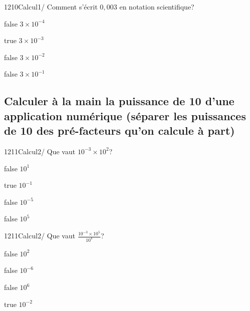 \documentclass[11pt]{article}
\begin{document}
        	\begin{question}{1210}{Calcul}{1}{/}
				Comment s'écrit $0,003$ en notation scientifique? 
            \end{question}

            \begin{reponses}
            	\item[false] $3\times 10^{-4}$
            	\item[true] $3\times 10^{-3}$
                \item[false] $3\times 10^{-2}$
                \item[false] $3\times 10^{-1}$
            \end{reponses}

        \subsection{Calculer à la main la puissance de 10 d'une application numérique (séparer les puissances de 10 des pré-facteurs qu'on calcule à part)}
        
        	\begin{question}{1211}{Calcul}{2}{/}
                Que vaut $10^{-3}\times 10^2$?
            \end{question}

            \begin{reponses}
            	\item[false] $10^{1}$
            	\item[true] $10^{-1}$
                \item[false] $10^{-5}$
                \item[false] $10^{5}$
            \end{reponses}

            \begin{question}{1211}{Calcul}{2}{/}
                Que vaut $\frac{10^{-3}\times 10^{5}}{10^{4}}$?
            \end{question}

            \begin{reponses}
                \item[false] $10^{2}$
                \item[false] $10^{-6}$
                \item[false] $10^{6}$
                \item[true] $10^{-2}$
            \end{reponses}
            
\end{document}
